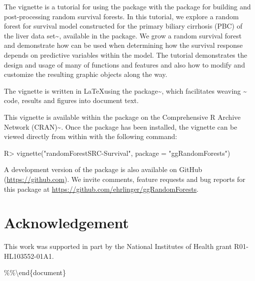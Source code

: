 \documentclass[article]{jss}
\begin{document}
The vignette is a tutorial for using the  package
with the  package for building and post-processing
random survival forests. In this tutorial, we explore a random forest
for survival model constructed for the primary biliary cirrhosis (PBC)
of the liver data set\textasciitilde{}\citep{fleming:1991}, available in
the  package. We grow a random survival forest and
demonstrate how  can be used when determining how
the survival response depends on predictive variables within the model.
The tutorial demonstrates the design and usage of many of
 functions and features and also how to modify and
customize the resulting  graphic objects along the way.

The vignette is written in \LaTeX using the 
package\textasciitilde{}\citep[\url{http://CRAN.R-project.org/package=knitr}]{Xie:2015, Xie:2014,Xie:2013},
which facilitates weaving \textasciitilde{}\citep{rcore}
code, results and figures into document text.

This vignette is available within the  package on
the Comprehensive R Archive Network
(CRAN)\textasciitilde{}\citep[\url{http://cran.r-project.org}]{rcore}.
Once the package has been installed, the vignette can be viewed directly
from within  with the following command:

\begin{Schunk}
\begin{Sinput}
R> vignette("randomForestSRC-Survival", package = "ggRandomForests")
\end{Sinput}
\end{Schunk}

A development version of the  package is also
available on GitHub (\url{https://github.com}). We invite comments,
feature requests and bug reports for this package at
\url{https://github.com/ehrlinger/ggRandomForests}.

\section*{Acknowledgement}

This work was supported in part by the National Institutes of Health
grant R01-HL103552-01A1.

\singlespacing


\%\%\textbackslash{}end\{document\}
\end{document}
